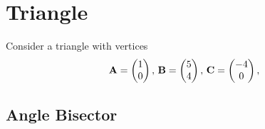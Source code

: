 \documentclass[11pt]{book}
\begin{document}
\frontmatter
\tableofcontents
\setcounter{page}{0}
\mainmatter
\chapter{Triangle}
Consider a triangle with vertices
\begin{align}
\label{eq:tri-pts}
\vec{A}=\myvec{1 \\ 0},\,
\vec{B}=\myvec{5\\4},\,
	\vec{C}=\myvec{-4\\0},\,
\end{align}
\section{Angle Bisector}

\end{document}
